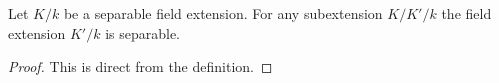 \begin{lemma}
\label{lemma-subextensions-are-separable}
Let $K/k$ be a separable field extension.
For any subextension $K/K'/k$ the field
extension $K'/k$ is separable.
\end{lemma}

\begin{proof}
This is direct from the definition.
\end{proof}